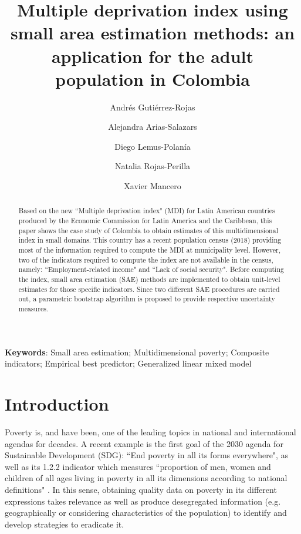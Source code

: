 \documentclass[a4paper, 11pt]{article}
\title{Multiple deprivation index using small area estimation methods: an application for the adult population in Colombia}
\author[1]{Andrés Gutiérrez-Rojas}
\author[2]{Alejandra Arias-Salazars}
\author[1]{Diego Lemus-Polanía}
\author[3]{Natalia Rojas-Perilla}
\author[1]{Xavier Mancero}
\affil[1]{Economic Commission for Latin America and the Caribbean}
\affil[2]{Freie Universität Berlin}
\affil[3]{United Arab Emirates University}
\date{}
\begin{document}
\maketitle


\begin{abstract}\small

Based on the new ``Multiple deprivation index" (MDI) for Latin American countries produced by the Economic Commission for Latin America and the Caribbean, this paper shows the case study of Colombia to obtain estimates of this multidimensional index in small domains. This country has a recent population census (2018) providing most of the information required to compute the MDI at municipality level. However,  two of the indicators required to compute the index are not available in the census, namely: ``Employment-related income" and ``Lack of social security". Before computing the index, small area estimation (SAE) methods are implemented to obtain unit-level estimates for those specific indicators. Since two different SAE procedures are carried out, a parametric bootstrap algorithm is proposed to provide respective uncertainty measures.  

\end{abstract}

{{\bf \noindent Keywords}: Small area estimation; Multidimensional poverty; Composite indicators; Empirical best predictor; Generalized linear mixed model}	

\clearpage

\section{Introduction}


Poverty is, and have been, one of the leading topics in national and international agendas for decades. A recent example is the first goal of the 2030 agenda for Sustainable Development (SDG): ``End poverty in all its forms everywhere", as well as its 1.2.2 indicator which measures ``proportion of men, women and children of all ages living in poverty in all its dimensions according to national definitions" \citep{UnitedNationsGeneralAssembly2015ResDevelopment}. In this sense,  obtaining quality data on poverty in its different expressions takes relevance as well as produce desegregated information (e.g. geographically or considering characteristics of the population) to identify and develop strategies to eradicate it.  
\end{document}
